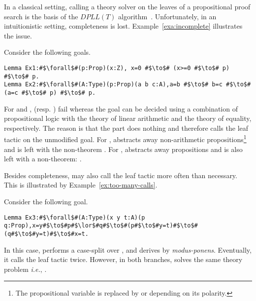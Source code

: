 \documentclass[utf8,a4paper,UKenglish,cleveref, autoref, thm-restate]{lipics-v2021}
\begin{document}
In a classical setting, calling a theory solver on the leaves of a
propositional proof search is the basis of the $\mathit{DPLL(T)}$
algorithm~\cite{GanzingerHNOT04}.  Unfortunately, in an intuitionistic
setting, completeness is lost. Example~\ref{exa:incomplete}
illustrates the issue.
\begin{example}
  \label{exa:incomplete}
  Consider the following goals.
  \begin{verbatim}
Lemma Ex1:#$\forall$#(p:Prop)(x:Z), x=0 #$\to$# (x>=0 #$\to$# p) #$\to$# p.
Lemma Ex2:#$\forall$#(A:Type)(p:Prop)(a b c:A),a=b #$\to$# b=c #$\to$# (a=c #$\to$# p) #$\to$# p.
\end{verbatim}
  For  and ,  (resp. ) fail whereas
  the goal can be decided using a combination of
  propositional logic with the theory of linear arithmetic and
  the theory of equality, respectively.
  The reason is that the  part does nothing and
  therefore calls the leaf tactic on the unmodified goal.  For
  ,  abstracts away non-arithmetic
  propositions\footnote{The propositional variable  is replaced by
     or  depending on its polarity.} and is
  left with the non-theorem
  .
  For ,  abstracts away
  propositions and is also left with a non-theorem:
  .
\end{example}
Besides completeness,  may also call the leaf tactic 
more often than necessary. %
This is illustrated by Example~\ref{ex:too-many-calls}.
\begin{example}
  \label{ex:too-many-calls}
  Consider the following goal.
  \begin{verbatim}
Lemma Ex3:#$\forall$#(A:Type)(x y t:A)(p q:Prop),x=y#$\to$#p#$\lor$#q#$\to$#(p#$\to$#y=t)#$\to$#(q#$\to$#y=t)#$\to$#x=t.
  \end{verbatim}
  In this case,  performs a case-split
  over , and derives  by
  \emph{modus-ponens}. Eventually, it calls the leaf tactic
   twice.  However, in both branches,
   solves the same theory problem \emph{i.e.},
  .
\end{example}
\end{document}
